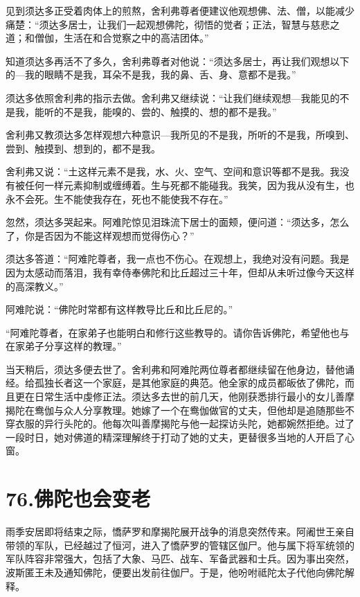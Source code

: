 \documentclass[12pt,twoside,openany]{book}
\begin{document}
见到须达多正受着肉体上的煎熬，舍利弗尊者便建议他观想佛、法、僧，以能减少痛楚：“须达多居士，让我们一起观想佛陀，彻悟的觉者；正法，智慧与慈悲之道；和僧伽，生活在和合觉察之中的高洁团体。”

知道须达多再活不了多久，舍利弗尊者对他说：“须达多居士，再让我们观想以下的---我的眼睛不是我，耳朵不是我，我的鼻、舌、身、意都不是我。”

须达多依照舍利弗的指示去做。舍利弗又继续说：“让我们继续观想---我能见的不是我，能听的不是我，能嗅的、尝的、触摸的、想的都不是我。”

舍利弗又教须达多怎样观想六种意识---我所见的不是我，所听的不是我，所嗅到、尝到、触摸到、想到的，都不是我。

舍利弗又说：“土这样元素不是我，水、火、空气、空间和意识等都不是我。我没有被任何一样元素抑制或缠缚着。生与死都不能碰我。我笑，因为我从没有生，也永不会死。生不能使我存在，死也不能使我不存在。”

忽然，须达多哭起来。阿难陀惊见泪珠流下居士的面颊，便问道：“须达多，怎么了，你是否因为不能这样观想而觉得伤心？”

须达多答道：“阿难陀尊者，我一点也不伤心。在观想上，我绝对没有问题。我是因为太感动而落泪，我有幸侍奉佛陀和比丘超过三十年，但却从未听过像今天这样的高深教义。”

阿难陀说：“佛陀时常都有这样教导比丘和比丘尼的。”

“阿难陀尊者，在家弟子也能明白和修行这些教导的。请你告诉佛陀，希望他也与在家弟子分享这样的教理。”

当天稍后，须达多便去世了。舍利弗和阿难陀两位尊者都继续留在他身边，替他诵经。给孤独长者这一个家庭，是其他家庭的典范。他全家的成员都皈依了佛陀，而且更在日常生活中虔修正法。须达多去世的前几天，他刚获悉排行最小的女儿善摩揭陀在鸯伽与众人分享教理。她嫁了一个在鸯伽做官的丈夫，但他却是追随那些不穿衣服的异行头陀的。他每次叫善摩揭陀与他一起探访头陀，她都婉然拒绝。过了一段时日，她对佛道的精深理解终于打动了她的丈夫，更替很多当地的人开启了心窗。


\chapter{76.佛陀也会变老}\label{ch76}

雨季安居即将结束之际，憍萨罗和摩揭陀展开战争的消息突然传来。阿阇世王亲自带领的军队，已经越过了恒河，进入了憍萨罗的管辖区伽尸。他与属下将军统领的军队阵容非常强大，包括了大象、马匹、战车、军备武器和士兵。因为事出突然，波斯匿王未及通知佛陀，便要出发前往伽尸。于是，他吩咐祗陀太子代他向佛陀解释。
\end{document}
